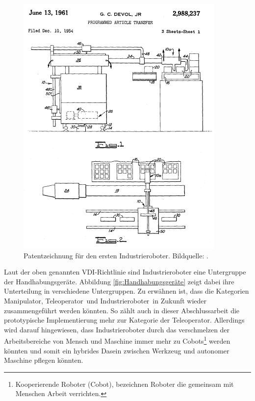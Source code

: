\begin{figure}[H]
	\centering
	\includegraphics[width=.5\textwidth]{figuren/Devol_Patent_1954}
	\caption{Patentzeichnung für den ersten Industrieroboter. Bildquelle: \cite{devol}.}
	\label{fig:Devol_Patent}
\end{figure}
Laut der oben genannten VDI-Richtlinie sind Industrieroboter eine Untergruppe der Handhabungsgeräte. Abbildung \ref{fig:Handhabungsgeräte} zeigt dabei ihre Unterteilung in verschiedene Untergruppen. Zu erwähnen ist, dass die Kategorien \frqq Manipulator, Teleoperator\flqq\ und \frqq Industrieroboter\flqq\ in Zukunft wieder zusammengeführt werden könnten. So zählt auch in dieser Abschlussarbeit die prototypische Implementierung mehr zur Kategorie der Teleoperator. Allerdings wird darauf hingewiesen, dass Industrieroboter durch das verschmelzen der Arbeitsbereiche von Mensch und Maschine immer mehr zu \frqq Cobots\flqq\footnote{ Kooperierende Roboter (Cobot), bezeichnen Roboter die gemeinsam
	mit Menschen Arbeit verrichten.} werden könnten und somit ein hybrides Dasein zwischen Werkzeug und autonomer Maschine pflegen könnten.

